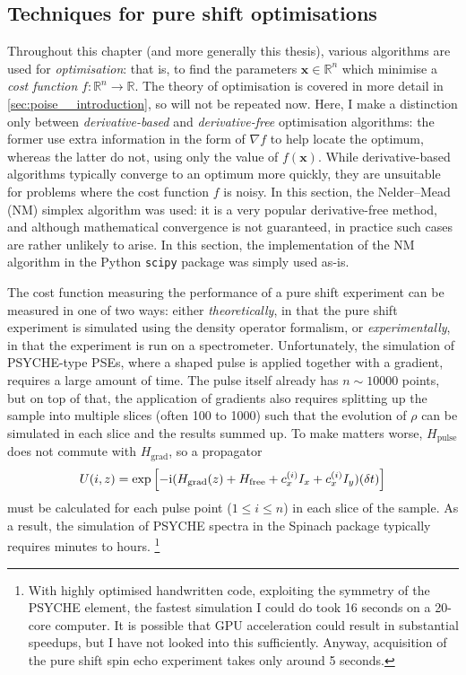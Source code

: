 \subsection{Techniques for pure shift optimisations}
\label{subsec:pureshift__optim_techniques}

Throughout this chapter (and more generally this thesis), various algorithms are used for \textit{optimisation}: that is, to find the parameters $\symbf{x} \in \mathbb{R}^n$ which minimise a \textit{cost function} $f : \mathbb{R}^n \to \mathbb{R}$.
The theory of optimisation is covered in more detail in \cref{sec:poise__introduction}, so will not be repeated now.
Here, I make a distinction only between \textit{derivative-based} and \textit{derivative-free} optimisation algorithms: the former use extra information in the form of $\nabla f$ to help locate the optimum, whereas the latter do not, using only the value of $f(\symbf{x})$.
While derivative-based algorithms typically converge to an optimum more quickly, they are unsuitable for problems where the cost function $f$ is noisy.
In this section, the Nelder--Mead (NM) simplex algorithm\autocite{Nelder1965TCJ} was used: it is a very popular derivative-free method, and although mathematical convergence is not guaranteed\autocite{McKinnon1998SIAMJO}, in practice such cases are rather unlikely to arise.
In this section, the implementation of the NM algorithm in the Python \texttt{scipy} package was simply used as-is.

The cost function measuring the performance of a pure shift experiment can be measured in one of two ways: either \textit{theoretically}, in that the pure shift experiment is simulated using the density operator formalism, or \textit{experimentally}, in that the experiment is run on a spectrometer.
Unfortunately, the simulation of PSYCHE-type PSEs, where a shaped pulse is applied together with a gradient, requires a large amount of time.
The pulse itself already has $n \sim 10000$ points, but on top of that, the application of gradients also requires splitting up the sample into multiple slices (often 100 to 1000) such that the evolution of $\rho$ can be simulated in each slice and the results summed up.
To make matters worse, $H_\text{pulse}$ does not commute with $H_\text{grad}$, so a propagator
\begin{equation}
    \label{eq:pulse_gradient_propagator}
    U(i, z) = \exp\left[-\mathrm{i}(H_\text{grad}(z) + H_\text{free} + c_x^{(i)}I_x + c_x^{(i)} I_y)(\delta t)\right]
\end{equation}
must be calculated for each pulse point ($1 \leq i \leq n$) in each slice of the sample.
As a result, the simulation of PSYCHE spectra in the Spinach package\Autocite{Hogben2011JMR} typically requires minutes to hours.%
\footnote{With highly optimised handwritten code, exploiting the symmetry of the PSYCHE element, the fastest simulation I could do took 16 seconds on a 20-core computer. It is possible that GPU acceleration could result in substantial speedups, but I have not looked into this sufficiently. Anyway, acquisition of the pure shift spin echo experiment takes only around 5 seconds.}

